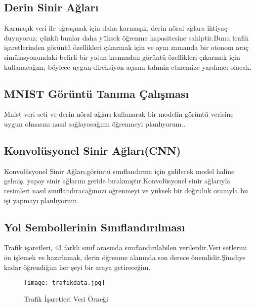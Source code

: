 \documentclass{article}
\begin{document}
\subsection{Derin Sinir Ağları}
Karmaşık veri ile uğraşmak için daha karmaşık, derin nöral ağlara ihtiyaç duyuyoruz; çünkü bunlar daha yüksek öğrenme kapasitesine sahiptir.Bunu trafik işaretlerinden görüntü özellikleri çıkarmak için ve aynı zamanda bir otonom araç simülasyonundaki belirli bir yolun kısmından görüntü özellikleri çıkarmak için kullanacağım; böylece uygun direksiyon açısını tahmin etmemize yardımcı olacak.\\[15pt]
\subsection{MNIST Görüntü Tanıma Çalışması}
Mnist veri seti ve derin nöral ağları kullanarak bir modelin görüntü verisine uygun olmasını nasıl sağlayacağımı öğrenmeyi planlıyorum..\\[15pt]

\subsection{Konvolüsyonel Sinir Ağları(CNN)}Konvolüsyonel Sinir Ağları,görüntü sınıflandırma için gidilecek model haline gelmiş, yapay sinir ağlarını geride bırakmıştır.Konvolüsyonel sinir ağlarıyla resimleri nasıl sınıflandıracağımızı öğrenmeyi ve yüksek bir doğruluk oranıyla bu işi yapmayı planlıyorum.\\[15pt]

\subsection{Yol Sembollerinin Sınıflandırılması}Trafik işaretleri, 43 farklı sınıf arasında sınıflandırılabilen verilerdir.Veri setlerini ön işlemek ve hazırlamak, derin öğrenme alanında son derece önemlidir\cite{saadna2019speed}.Şimdiye kadar öğrendiğim her şeyi bir araya getireceğim.\\[15pt]

\begin{figure}[h]
  \centering
  \texttt{[image: trafikdata.jpg]} %
  \caption{Trafik İşaretleri Veri Örneği}
  \label{fig:resim_etiketi}
\end{figure}
\end{document}

